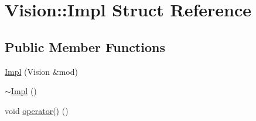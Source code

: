 \hypertarget{structVision_1_1Impl}{\section{Vision\-:\-:Impl Struct Reference}
\label{structVision_1_1Impl}
}
\subsection*{Public Member Functions}
\begin{DoxyCompactItemize}
\item 
\hyperlink{structVision_1_1Impl_ac9c6eb4b27729ceab3539f69cbb25a20}{Impl} (Vision \&mod)
\item 
\hyperlink{structVision_1_1Impl_aa096fb20f6e7b5b18cb66d20eda13f7c}{$\sim$\-Impl} ()
\item 
void \hyperlink{structVision_1_1Impl_a56670c4b36d664ccf92bed30b3772b2b}{operator()} ()
\end{DoxyCompactItemize}
